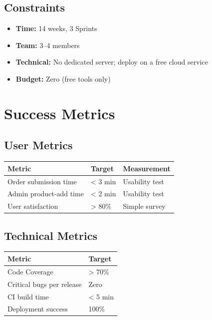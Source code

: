 \documentclass[12pt, a4paper]{article}
\begin{document}
\subsection{Constraints}
\begin{itemize}
    \item \textbf{Time:} 14 weeks, 3 Sprints
    \item \textbf{Team:} 3--4 members
    \item \textbf{Technical:} No dedicated server; deploy on a free cloud service
    \item \textbf{Budget:} Zero (free tools only)
\end{itemize}

\section{Success Metrics}

\subsection{User Metrics}
\begin{center}
\begin{tabular}{|l|l|l|}
\hline
\textbf{Metric} & \textbf{Target} & \textbf{Measurement} \\
\hline
Order submission time & < 3 min & Usability test \\
\hline
Admin product-add time & < 2 min & Usability test \\
\hline
User satisfaction & > 80\% & Simple survey \\
\hline
\end{tabular}
\end{center}

\subsection{Technical Metrics}
\begin{center}
\begin{tabular}{|l|l|}
\hline
\textbf{Metric} & \textbf{Target} \\
\hline
Code Coverage & > 70\% \\
\hline
Critical bugs per release & Zero \\
\hline
CI build time & < 5 min \\
\hline
Deployment success & 100\% \\
\hline
\end{tabular}
\end{center}
\end{document}

